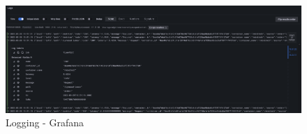 \begin{figure}[H]
    \centering
    \includegraphics[width = \linewidth]{images/monitoring/logging_1.png}
    \caption{Logging - Grafana}
\end{figure}
